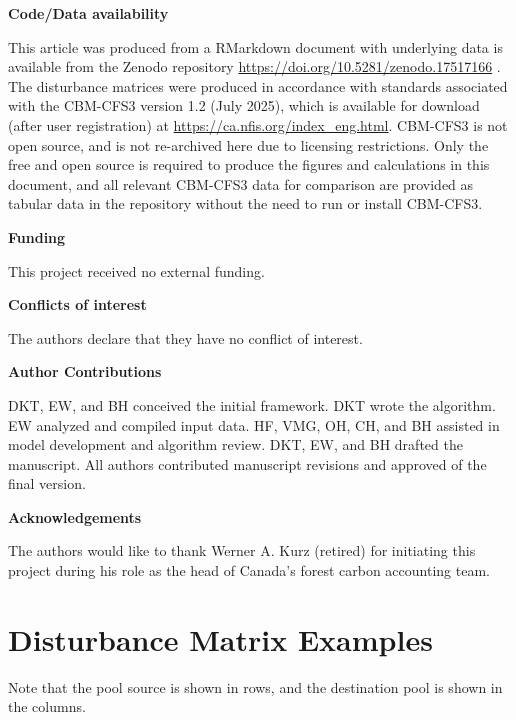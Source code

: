 \documentclass[, manuscript]{copernicus}
\begin{document}
\textbf{Code/Data availability}

This article was produced from a RMarkdown document with underlying data
is available from the Zenodo repository
\url{https://doi.org/10.5281/zenodo.17517166} \citep{thompson2025}. The
disturbance matrices were produced in accordance with standards
associated with the CBM-CFS3 version 1.2 (July 2025), which is available
for download (after user registration) at
\url{https://ca.nfis.org/index_eng.html}. CBM-CFS3 is not open source,
and is not re-archived here due to licensing restrictions. Only the free
and open source \citet{thompson2025} is required to produce the figures
and calculations in this document, and all relevant CBM-CFS3 data for
comparison are provided as tabular data in the \citet{thompson2025}
repository without the need to run or install CBM-CFS3.

\textbf{Funding}

This project received no external funding.

\textbf{Conflicts of interest}

The authors declare that they have no conflict of interest.

\textbf{Author Contributions}

DKT, EW, and BH conceived the initial framework. DKT wrote the
algorithm. EW analyzed and compiled input data. HF, VMG, OH, CH, and BH
assisted in model development and algorithm review. DKT, EW, and BH
drafted the manuscript. All authors contributed manuscript revisions and
approved of the final version.

\textbf{Acknowledgements}

The authors would like to thank Werner A. Kurz (retired) for initiating
this project during his role as the head of Canada's forest carbon
accounting team.

\clearpage

\appendix

\section{Disturbance Matrix Examples}

Note that the pool source is shown in rows, and the destination pool is
shown in the columns.
\end{document}
